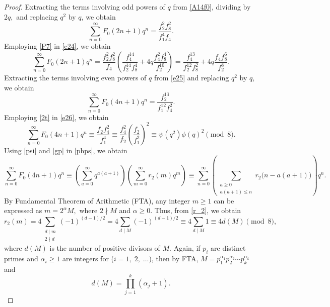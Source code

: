 \documentclass[12pt]{article}
\numberwithin{equation}{section}
\theoremstyle{definition}
\theoremstyle{remark}
\numberwithin{equation}{section}
\begin{document}
\begin{proof}
    Extracting the terms involving odd powers of $q$ from \eqref{A14f0}, dividing by $2q,$ and replacing $q^2$ by $q$,  we obtain
\begin{equation}\label{e24}
\sum_{n=0}^{\infty}F_0(2n+1)q^n
=
\dfrac{f_2^2f_8^2}{f_1^4f_4}.
\end{equation}
Employing \eqref{P7} in \eqref{e24}, we obtain
\begin{equation}\label{e25}
\sum_{n=0}^{\infty}F_0(2n+1)q^n
=
\dfrac{f_2^2f_8^2}{f_4}
\left(
\dfrac{f_4^{14}}{f_2^{14}f_8^4}
+
4q\dfrac{f_4^2f_8^4}{f_2^{10}}
\right) 
=
\dfrac{f_4^{13}}{f_2^{12}f_8^2}
+
4q\dfrac{f_4f_8^6}{f_2^8}.
\end{equation}
Extracting the terms involving even powers of $q$ from \eqref{e25} and replacing $q^2$ by $q,$ we obtain
\begin{equation}\label{e26}
\sum_{n=0}^{\infty}F_0(4n+1)q^n
=
\dfrac{f_2^{13}}{f_1^{12}f_4^2}.
\end{equation}
Employing \eqref{2t} in \eqref{e26},
we obtain
\begin{equation}\label{phps}
\sum_{n=0}^{\infty}F_0(4n+1)q^n
\equiv
\dfrac{f_2f_4^2}{f_1^4}
\equiv\dfrac{f_4^2}{f_2}
\left(\dfrac{f_2}{f_1^2}\right)^2
\equiv\psi(q^2)\phi(q)^2
\pmod 8.
\end{equation}
Using \eqref{psi} and \eqref{gp} in \eqref{phps}, we obtain
\begin{equation}\label{fg8}
\sum_{n=0}^{\infty}F_0(4n+1)q^n
\equiv
\left(\sum_{a=0}^{\infty}q^{a(a+1)}\right)
\left(\sum_{m=0}^{\infty}r_2(m)q^m\right) 
\equiv
\sum_{n=0}^{\infty}
\left(
\sum_{\substack{a\geq0\\a(a+1)\leq n}}
r_2\bigl(n-a(a+1)\bigr)
\right)q^n.
\end{equation}
By  Fundamental Theorem of Arithmetic (FTA), any integer $m\geq1$ can be expressed as $m=2^\alpha M,$ where $2\nmid M$ and $\alpha\geq0.$ Thus, from \eqref{r_2}, we obtain
\begin{equation}\label{fg8e}
r_2(m)
=
4\sum_{\substack{d\mid m\\2\nmid d}}(-1)^{(d-1)/2}
=
4\sum_{d\mid M}(-1)^{(d-1)/2} 
\equiv
4\sum_{d\mid M}1
\equiv
4d(M)
\pmod 8,
\end{equation}
where $d(M)$ is the number of positive divisors of $M.$ Again, if $p_i$ are distinct primes  and $\alpha_i\geq1$ are integers for ($i=1,\;2,\;\ldots$), then by FTA, 
$M=p_1^{\alpha_1}p_2^{\alpha_2}\cdots p_k^{\alpha_k}$
and 
\begin{equation}\label{fg10}
d(M)
=
\prod_{j=1}^{k}(\alpha_j+1).

\end{equation}
\end{proof}
\end{document}
